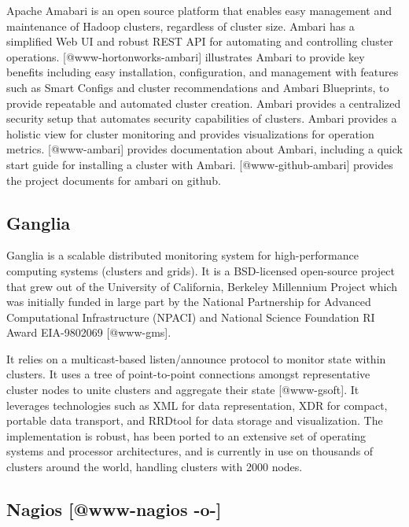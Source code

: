 Apache Amabari is an open source platform that enables easy management
and maintenance of Hadoop clusters, regardless of cluster size. Ambari
has a simplified Web UI and robust REST API for automating and
controlling cluster operations. [@www-hortonworks-ambari]
illustrates Ambari to provide key benefits including easy
installation, configuration, and management with features such as
Smart Configs and cluster recommendations and Ambari Blueprints, to
provide repeatable and automated cluster creation. Ambari provides a
centralized security setup that automates security capabilities of
clusters. Ambari provides a holistic view for cluster monitoring and
provides visualizations for operation metrics. [@www-ambari]
provides documentation about Ambari, including a quick start guide for
installing a cluster with Ambari. [@www-github-ambari] provides
the project documents for ambari on github.
     
\subsection{Ganglia}

Ganglia is a scalable distributed monitoring system for
high-performance computing systems (clusters and grids). It is a
BSD-licensed open-source project that grew out of the University of
California, Berkeley Millennium Project which was initially funded in
large part by the National Partnership for Advanced Computational
Infrastructure (NPACI) and National Science Foundation RI Award
EIA-9802069 [@www-gms].

It relies on a multicast-based listen/announce protocol to monitor
state within clusters. It uses a tree of point-to-point connections
amongst representative cluster nodes to unite clusters and aggregate
their state [@www-gsoft]. It leverages technologies such as XML
for data representation, XDR for compact, portable data transport, and
RRDtool for data storage and visualization. The implementation is
robust, has been ported to an extensive set of operating systems and
processor architectures, and is currently in use on thousands of
clusters around the world, handling clusters with 2000 nodes.
     
\subsection{Nagios [@www-nagios -o-]}


